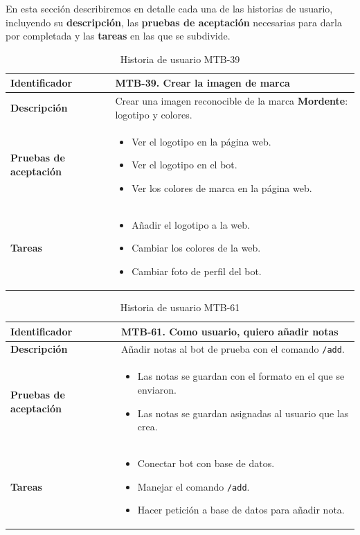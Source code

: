 En esta sección describiremos en detalle cada una de las historias de usuario, incluyendo su \textbf{descripción}, las \textbf{pruebas de aceptación} necesarias para darla por completada y las \textbf{tareas} en las que se subdivide.


\newcommand{\historia}[5]{
\begin{table}[H]
\setlength\extrarowheight{2pt} %
\begin{tabularx}{\textwidth}{| p{.20\textwidth} | p{.741\textwidth} |}
\hline
\textbf{Identificador} & #1. #2  \\ \hline
\textbf{Descripción} & #3  \\ \hline
\textbf{Pruebas de aceptación} & #4  \\ \hline
\textbf{Tareas} & #5  \\ \hline
\end{tabularx}
\caption{Historia de usuario #1}\label{tab:mtb#1}
\end{table}
}

\historia{MTB-39}{Crear la imagen de marca}{Crear una imagen reconocible de la marca \textbf{Mordente}: logotipo y colores.}{
\begin{itemize}
    \item Ver el logotipo en la página web.
    \item Ver el logotipo en el bot.
    \item Ver los colores de marca en la página web.
\end{itemize}
}{
\begin{itemize}
    \item Añadir el logotipo a la web.
    \item Cambiar los colores de la web.
    \item Cambiar foto de perfil del bot.
\end{itemize}
}

\historia{MTB-61}{Como usuario, quiero añadir notas}{
Añadir notas al bot de prueba con el comando \texttt{/add}.
}{
\begin{itemize}
    \item Las notas se guardan con el formato en el que se enviaron.
    \item Las notas se guardan asignadas al usuario que las crea.
\end{itemize}
}{
\begin{itemize}
    \item Conectar bot con base de datos.
    \item Manejar el comando \texttt{/add}.
    \item Hacer petición a base de datos para añadir nota.
\end{itemize}
}

